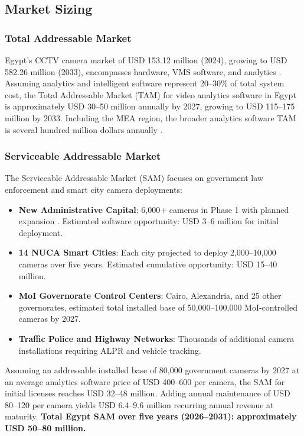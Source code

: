 \subsection{Market Sizing}

\subsubsection{Total Addressable Market}

Egypt's CCTV camera market of USD 153.12 million (2024), growing to USD 582.26 million (2033), encompasses hardware, VMS software, and analytics \cite{imarc_egypt}. Assuming analytics and intelligent software represent 20--30\% of total system cost, the Total Addressable Market (TAM) for video analytics software in Egypt is approximately USD 30--50 million annually by 2027, growing to USD 115--175 million by 2033. Including the MEA region, the broader analytics software TAM is several hundred million dollars annually \cite{mordorintelligence_mea, grandview_mea}.

\subsubsection{Serviceable Addressable Market}

The Serviceable Addressable Market (SAM) focuses on government law enforcement and smart city camera deployments:
\begin{itemize}
    \item \textbf{New Administrative Capital}: 6,000+ cameras in Phase 1 with planned expansion \cite{nac_cctv_context, egypt_nac_59b}. Estimated software opportunity: USD 3--6 million for initial deployment.
    \item \textbf{14 NUCA Smart Cities}: Each city projected to deploy 2,000--10,000 cameras over five years. Estimated cumulative opportunity: USD 15--40 million.
    \item \textbf{MoI Governorate Control Centers}: Cairo, Alexandria, and 25 other governorates, estimated total installed base of 50,000--100,000 MoI-controlled cameras by 2027.
    \item \textbf{Traffic Police and Highway Networks}: Thousands of additional camera installations requiring ALPR and vehicle tracking.
\end{itemize}
Assuming an addressable installed base of 80,000 government cameras by 2027 at an average analytics software price of USD 400--600 per camera, the SAM for initial licenses reaches USD 32--48 million. Adding annual maintenance of USD 80--120 per camera yields USD 6.4--9.6 million recurring annual revenue at maturity. \textbf{Total Egypt SAM over five years (2026--2031): approximately USD 50--80 million.}

